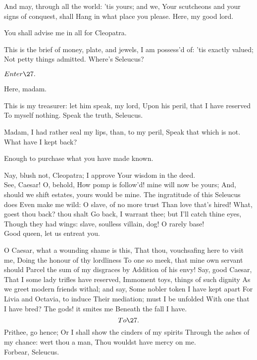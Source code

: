 \documentclass{book}
\begin{document}
\2	And may, through all the world: 'tis yours; and we,
	Your scutcheons and your signs of conquest, shall
	Hang in what place you please. Here, my good lord.

\3	You shall advise me in all for Cleopatra.

\2	This is the brief of money, plate, and jewels,
	I am possess'd of: 'tis exactly valued;
	Not petty things admitted. Where's Seleucus?

	\(Enter \27.\)

	Here, madam.

\2	This is my treasurer: let him speak, my lord,
	Upon his peril, that I have reserved
	To myself nothing. Speak the truth, Seleucus.

	Madam,
	I had rather seal my lips, than, to my peril,
	Speak that which is not. \\

\2	What have I kept back?

	Enough to purchase what you have made known.

\3	Nay, blush not, Cleopatra; I approve
	Your wisdom in the deed. \\

\2	See, Caesar! O, behold,
	How pomp is follow'd! mine will now be yours;
	And, should we shift estates, yours would be mine.
	The ingratitude of this Seleucus does
	Even make me wild: O slave, of no more trust
	Than love that's hired! What, goest thou back? thou shalt
	Go back, I warrant thee; but I'll catch thine eyes,
	Though they had wings: slave, soulless villain, dog!
	O rarely base! \\

\3	                  Good queen, let us entreat you.

\2	O Caesar, what a wounding shame is this,
	That thou, vouchsafing here to visit me,
	Doing the honour of thy lordliness
	To one so meek, that mine own servant should
	Parcel the sum of my disgraces by
	Addition of his envy! Say, good Caesar,
	That I some lady trifles have reserved,
	Immoment toys, things of such dignity
	As we greet modern friends withal; and say,
	Some nobler token I have kept apart
	For Livia and Octavia, to induce
	Their mediation; must I be unfolded
	With one that I have bred? The gods! it smites me
	Beneath the fall I have. \[To \27.\] Prithee, go hence;
	Or I shall show the cinders of my spirits
	Through the ashes of my chance: wert thou a man,
	Thou wouldst have mercy on me. \\

\3	Forbear, Seleucus.
\end{document}
